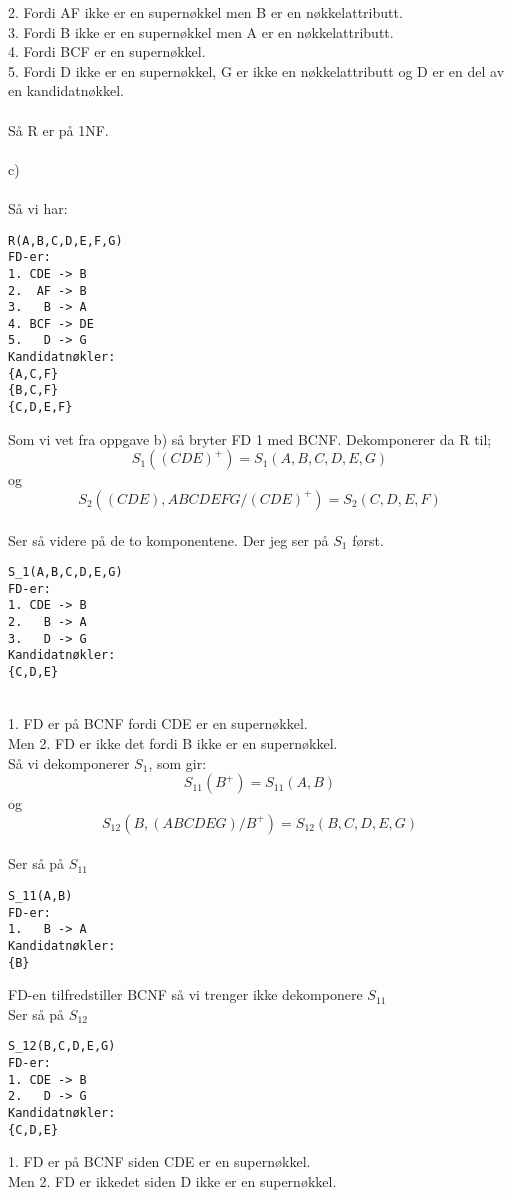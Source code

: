 \documentclass[12pt, letterpaper, twoside]{article}
\begin{document}
2. Fordi AF ikke er en supernøkkel men B er en nøkkelattributt.\\
3. Fordi B ikke er en supernøkkel men A er en nøkkelattributt.\\
4. Fordi BCF er en supernøkkel.\\
5. Fordi D ikke er en supernøkkel, G er ikke en nøkkelattributt og D er en del av en kandidatnøkkel.\\
\\
Så R er på 1NF.\\
\ \\
c)\\
\ \\
Så vi har:
\begin{verbatim}
R(A,B,C,D,E,F,G)
FD-er:
1. CDE -> B
2.  AF -> B 
3.   B -> A   
4. BCF -> DE 
5.   D -> G 
Kandidatnøkler:
{A,C,F}
{B,C,F}
{C,D,E,F}
\end{verbatim}
Som vi vet fra oppgave b) så bryter FD 1 med BCNF. Dekomponerer da R til;
$$
S_1((CDE)^+) = S_1(A,B,C,D,E,G)
$$
og
$$
S_2((CDE),ABCDEFG/(CDE)^+) = S_2(C,D,E,F)
$$
\ \\
Ser så videre på de to komponentene. Der jeg ser på $S_1$ først. 
\newpage
\ \\
\begin{verbatim}
S_1(A,B,C,D,E,G)
FD-er:
1. CDE -> B
2.   B -> A
3.   D -> G
Kandidatnøkler:
{C,D,E}
\end{verbatim}
\ \\
1. FD er på BCNF fordi CDE er en supernøkkel.\\
Men 2. FD er ikke det fordi B ikke er en supernøkkel.\\
Så vi dekomponerer $S_1$, som gir:\\
$$
S_{11}(B^+) = S_{11}(A,B)
$$
og
$$
S_{12}(B,(ABCDEG)/B^+) = S_{12}(B,C,D,E,G)
$$
\ \\
Ser så på $S_{11}$
\begin{verbatim}
S_11(A,B)
FD-er:
1.   B -> A
Kandidatnøkler:
{B}
\end{verbatim}
FD-en tilfredstiller BCNF så vi trenger ikke dekomponere $S_{11}$
\newpage
\ \\
Ser så på $S_{12}$\\
\begin{verbatim}
S_12(B,C,D,E,G)
FD-er:
1. CDE -> B
2.   D -> G
Kandidatnøkler:
{C,D,E}
\end{verbatim}
1. FD er på BCNF siden CDE er en supernøkkel.\\
Men 2. FD er ikkedet siden D ikke er en supernøkkel.\\
\end{document}
